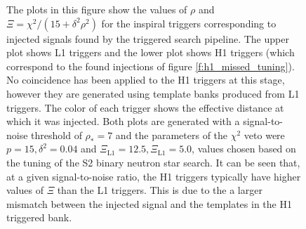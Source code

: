 \begin{figure}[p]
\caption[Illustration of Tuning Based on Injections]{%
\label{f:h1_inj_xi_tuning}%
The plots in this figure show the values of $\rho$ and $\Xi = \chi^2/(15 +
\delta^2\rho^2)$ for the inspiral triggers corresponding to injected signals
found by the triggered search pipeline. The upper plot shows L1 triggers and
the lower plot shows H1 triggers (which correspond to the found injections of
figure \ref{f:h1_missed_tuning}). No coincidence has been applied to the H1
triggers at this stage, however they are generated using template banks
produced from L1 triggers. The color of each trigger shows the effective
distance at which it was injected.  Both plots are generated with a
signal-to-noise threshold of $\rho_\ast = 7$ and the parameters of the
$\chi^2$ veto were $p = 15, \delta^2 = 0.04$ and $\Xi_\mathrm{L1} = 12.5,
\Xi_\mathrm{L1} = 5.0$, values chosen based on the tuning of the S2 binary
neutron star search. It can be seen that, at a given signal-to-noise ratio,
the H1 triggers typically have higher values of $\Xi$ than the L1 triggers.
This is due to the a larger mismatch between the injected signal and the
templates in the H1 triggered bank.
}
\end{figure}

